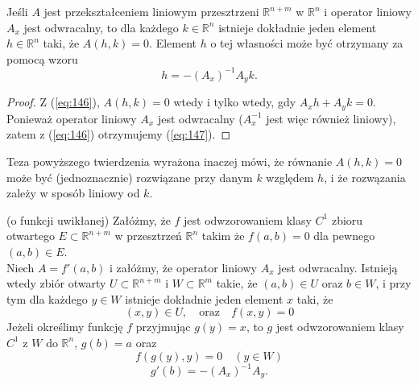 \documentclass[leqno]{article}
\begin{document}
\begin{justify}
\begin{theorem}
{
    Jeśli $A$ jest przekształceniem liniowym przesztrzeni $\mathbb{R}^{n+m}$ w $\mathbb{R}^n$ i operator liniowy $A_x$ jest odwracalny,
    to dla każdego $k \in \mathbb{R}^n$ istnieje dokładnie jeden element $h \in \mathbb{R}^n$ taki, że $A(h,k)=0$. Element $h$ o tej własności może być otrzymany za pomocą wzoru
    \begin{equation}\label{eq:147}
        h = -{(A_x)}^{-1}A_y k.
    \end{equation}
}
\end{theorem}

\begin{proof}
    Z (\ref{eq:146}), $A(h,k) = 0$ wtedy i tylko wtedy, gdy $A_x h + A_y k = 0$. Ponieważ operator liniowy $A_x$ jest odwracalny ($A_x^{-1}$ jest więc również liniowy), zatem z (\ref{eq:146}) otrzymujemy (\ref{eq:147}).
\end{proof}

\begin{uwaga}
    Teza powyższego twierdzenia wyrażona inaczej mówi, że równanie $A(h,k) = 0$ może być (jednoznacznie)
    rozwiązane przy danym $k$ względem $h$, i że rozwązania zależy w sposób liniowy od $k$.
\end{uwaga}

\begin{theorem}
{
    (o funkcji uwikłanej) Załóżmy, że $f$ jest odwzorowaniem klasy $C^1$ zbioru otwartego $E \subset \mathbb{R}^{n+m}$ w przesztrzeń $\mathbb{R}^n$ 
    takim że $f(a,b) = 0$ dla pewnego $(a,b) \in E$. \\ 
    Niech $A = f'(a,b)$ i załóżmy, że operator liniowy $A_x$ jest odwracalny. Istnieją wtedy zbiór otwarty $U \subset \mathbb{R}^{n+m}$ i $W \subset \mathbb{R}^m$
    takie, że $(a,b) \in U$ oraz $b \in W$, i przy tym dla każdego $y \in W$ istnieje dokładnie jeden element $x$ taki, że 
    \begin{equation}\label{eq:148}
        (x,y) \in U, \quad \text{oraz} \quad f(x,y) = 0
    \end{equation}
    Jeżeli określimy funkcję $f$ przyjmując $g(y) = x$, to $g$ jest odwzorowaniem klasy $C^1$ z $W$ do $\mathbb{R}^n$, $g(b) = a$ oraz 
    \begin{equation}\label{eq:149}
        f(g(y), y) = 0 \quad (y \in W)
    \end{equation}
    \begin{equation}\label{eq:150}
        g'(b) = -{(A_x)}^{-1}A_y.
    \end{equation}
}
\end{theorem}


\end{justify}
\end{document}
